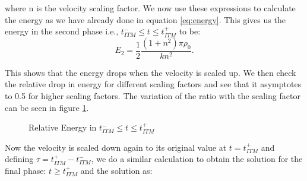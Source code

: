 where n is the velocity scaling factor. We now use these expressions to calculate the energy as we have already done in equation \ref{eq:energy}. This gives us the energy in the second phase i.e., $t_{ITM}^- \leq t \leq t_{ITM}^+ $ to be:
\begin{equation}
    E_2 = \frac{1}{2}\frac{\left(1 + n^2\right)\pi \rho_0}{kn^2} .
\end{equation}

This shows that the energy drops when the velocity is scaled up. We then check the relative drop in energy for different scaling factors and see that it asymptotes to 0.5 for higher scaling factors. The variation of the ratio with the scaling factor can be seen in figure \ref{fig:ratio1}.

\begin{figure}
    \centering
    \caption{Relative Energy in $t_{ITM}^- \leq t \leq t_{ITM}^+$}
    \label{fig:ratio1}
\end{figure}

Now the velocity is scaled down again to its original value at $t=t_{ITM}^+$ and defining $\tau = t_{ITM}^+ - t_{ITM}^-$, we do a similar calculation to obtain the solution for the final phase: $t \geq t_{ITM}^+$ and the solution as:

